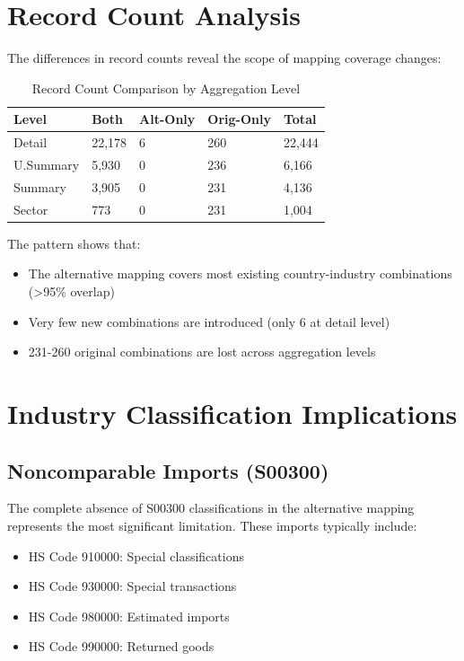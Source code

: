 \documentclass[11pt]{article}
\begin{document}
\section{Record Count Analysis}

The differences in record counts reveal the scope of mapping coverage changes:

\begin{table}[H]
\centering
\caption{Record Count Comparison by Aggregation Level}
\begin{tabular}{lR{1.5cm}R{1.5cm}R{1.5cm}R{1.5cm}}
\toprule
\textbf{Level} & \textbf{Both} & \textbf{Alt-Only} & \textbf{Orig-Only} & \textbf{Total} \\
\midrule
Detail & 22,178 & 6 & 260 & 22,444 \\
U.Summary & 5,930 & 0 & 236 & 6,166 \\
Summary & 3,905 & 0 & 231 & 4,136 \\
Sector & 773 & 0 & 231 & 1,004 \\
\bottomrule
\end{tabular}
\label{tab:record_counts}
\end{table}

The pattern shows that:
\begin{itemize}
\item The alternative mapping covers most existing country-industry combinations (>95\% overlap)
\item Very few new combinations are introduced (only 6 at detail level)
\item 231-260 original combinations are lost across aggregation levels
\end{itemize}

\section{Industry Classification Implications}

\subsection{Noncomparable Imports (S00300)}

The complete absence of S00300 classifications in the alternative mapping represents the most significant limitation. These imports typically include:
\begin{itemize}
\item HS Code 910000: Special classifications
\item HS Code 930000: Special transactions  
\item HS Code 980000: Estimated imports
\item HS Code 990000: Returned goods
\end{itemize}
\end{document}
